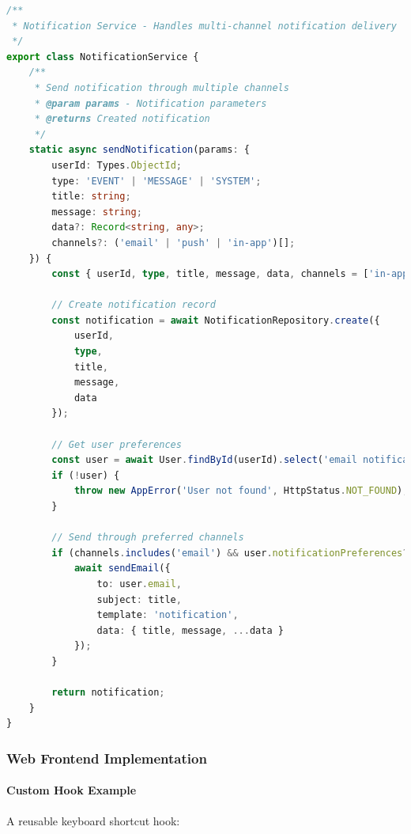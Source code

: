 \begin{lstlisting}[language=TypeScript, caption={Notification Service Implementation}]
/**
 * Notification Service - Handles multi-channel notification delivery
 */
export class NotificationService {
    /**
     * Send notification through multiple channels
     * @param params - Notification parameters
     * @returns Created notification
     */
    static async sendNotification(params: {
        userId: Types.ObjectId;
        type: 'EVENT' | 'MESSAGE' | 'SYSTEM';
        title: string;
        message: string;
        data?: Record<string, any>;
        channels?: ('email' | 'push' | 'in-app')[];
    }) {
        const { userId, type, title, message, data, channels = ['in-app'] } = params;

        // Create notification record
        const notification = await NotificationRepository.create({
            userId,
            type,
            title,
            message,
            data
        });

        // Get user preferences
        const user = await User.findById(userId).select('email notificationPreferences');
        if (!user) {
            throw new AppError('User not found', HttpStatus.NOT_FOUND);
        }

        // Send through preferred channels
        if (channels.includes('email') && user.notificationPreferences?.email) {
            await sendEmail({
                to: user.email,
                subject: title,
                template: 'notification',
                data: { title, message, ...data }
            });
        }

        return notification;
    }
}
\end{lstlisting}

\subsubsection{Web Frontend Implementation}
\label{subsubsec:web_examples}

\paragraph{Custom Hook Example}
A reusable keyboard shortcut hook:

